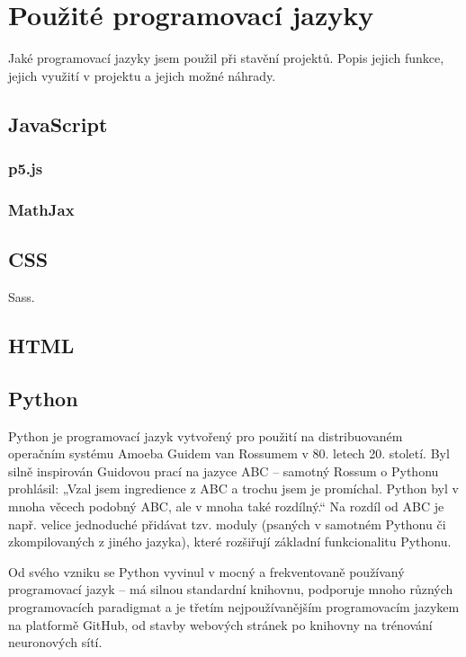 \documentclass[a4paper, 12pt]{article}
\begin{document}
  \section{Použité programovací jazyky}
  Jaké programovací jazyky jsem použil při stavění projektů.
  Popis jejich funkce, jejich využití v projektu a jejich možné náhrady.

  \subsection{JavaScript}

  \subsubsection{p5.js}

  \subsubsection{MathJax}

  \subsection{CSS}
  Sass.

  \subsection{HTML}

  \subsection{Python}
  Python je programovací jazyk vytvořený pro použití na distribuovaném operačním systému Amoeba Guidem van Rossumem v 80. letech 20. století. Byl silně inspirován Guidovou prací na jazyce ABC -- samotný Rossum o Pythonu prohlásil: „Vzal jsem ingredience z ABC a trochu jsem je promíchal. Python byl v mnoha věcech podobný ABC, ale v mnoha také rozdílný.“ Na rozdíl od ABC je např. velice jednoduché přidávat tzv. moduly (psaných v samotném Pythonu či zkompilovaných z jiného jazyka), které rozšiřují základní funkcionalitu Pythonu\cite{making-of-python}.

  Od svého vzniku se Python vyvinul v mocný a frekventovaně používaný programovací jazyk -- má silnou standardní knihovnu, podporuje mnoho různých programovacích paradigmat a je třetím nejpoužívanějším programovacím jazykem na platformě GitHub\cite{github-statistics}, od stavby webových stránek po knihovny na trénování neuronových sítí.
\end{document}
